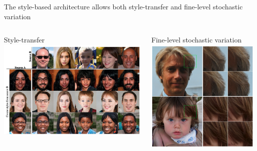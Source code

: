 \documentclass[8pt,xcolor=table,aspectratio=169]{beamer}
\begin{document}
\begin{frame}{The style-based architecture allows both style-transfer and fine-level stochastic variation}

\begin{columns}
\begin{column}{0.6\textwidth}
\centering
Style-transfer
\includegraphics[width=\columnwidth]{Afh1Rkf.jpg}

\end{column}
\begin{column}{0.4\textwidth}
\centering
Fine-level stochastic variation
\includegraphics[width=\columnwidth]{VGY5xB7.png}

\end{column}
\end{columns}
\end{frame}
\end{document}
